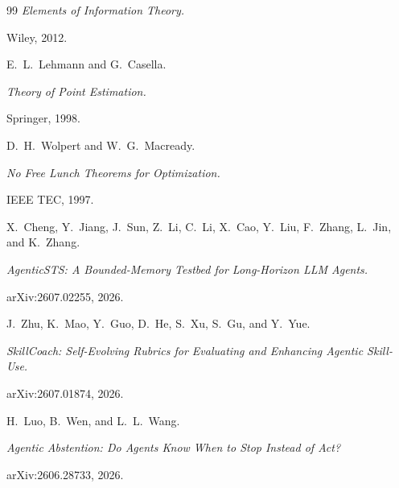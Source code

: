 \documentclass[11pt]{article}
\begin{document}
\begin{thebibliography}{99}
\newblock \textit{Elements of Information Theory.}

\newblock Wiley, 2012.

 E.~L.~Lehmann and G.~Casella.

\newblock \textit{Theory of Point Estimation.}

\newblock Springer, 1998.

 D.~H.~Wolpert and W.~G.~Macready.

\newblock \textit{No Free Lunch Theorems for Optimization.}

\newblock IEEE TEC, 1997.

 X.~Cheng, Y.~Jiang, J.~Sun, Z.~Li, C.~Li, X.~Cao, Y.~Liu, F.~Zhang, L.~Jin, and K.~Zhang.

\newblock \textit{AgenticSTS: A Bounded-Memory Testbed for Long-Horizon LLM Agents.}

\newblock arXiv:2607.02255, 2026.

 J.~Zhu, K.~Mao, Y.~Guo, D.~He, S.~Xu, S.~Gu, and Y.~Yue.

\newblock \textit{SkillCoach: Self-Evolving Rubrics for Evaluating and Enhancing Agentic Skill-Use.}

\newblock arXiv:2607.01874, 2026.

 H.~Luo, B.~Wen, and L.~L.~Wang.

\newblock \textit{Agentic Abstention: Do Agents Know When to Stop Instead of Act?}

\newblock arXiv:2606.28733, 2026.

\end{thebibliography}
\end{document}

